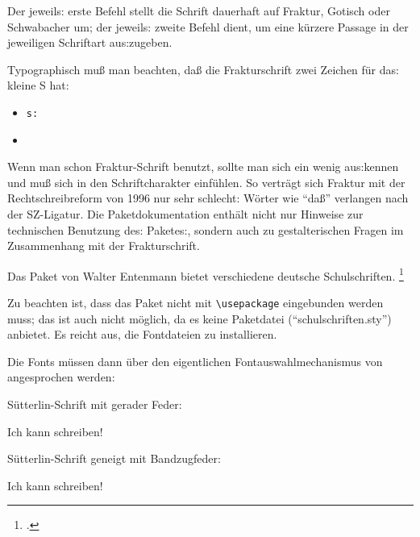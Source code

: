 {\frakfamily
Der jeweils: erste Befehl stellt die Schrift dauerhaft auf Fraktur, Gotisch oder
Schwabacher um; der jeweils: zweite Befehl dient, um eine kürzere Passage in der 
jeweiligen Schriftart aus:zugeben.}

{\frakfamily 
Typographisch muß man beachten, daß die Frakturschrift zwei Zeichen für das: kleine S hat:
}

\begin{itemize}
 \item {}
  \lstinline/s:/  
 \item {}
\end{itemize}

{\frakfamily
Wenn man schon Fraktur-Schrift benutzt, sollte man sich ein wenig aus:kennen und muß
sich in den Schriftcharakter einfühlen. So verträgt sich Fraktur mit der Rechtschreibreform
von 1996 nur sehr schlecht: Wörter wie \enquote{daß} verlangen nach der SZ-Ligatur.
Die Paketdokumentation enthält nicht nur Hinweise zur technischen Benutzung des: 
Paketes:, sondern auch zu gestalterischen Fragen im Zusammenhang mit der Frakturschrift.
}



Das Paket  von Walter Entenmann bietet verschiedene deutsche Schulschriften.
\footcite[Zur Geschichte der deutschen Schulschriften sowie dem Vorgehen zu ihrer Implementierung 
in \LaTeX:][]{entenmann:dtk2012/4}

Zu beachten ist, dass das Paket nicht mit \lstinline/\usepackage/ eingebunden werden muss;
das ist auch nicht möglich, da es keine Paketdatei (\enquote{schulschriften.sty}) anbietet.
Es reicht aus, die Fontdateien zu installieren.

Die Fonts müssen dann über den eigentlichen Fontauswahlmechanismus von \LaTeXe{} angesprochen werden:

Sütterlin-Schrift mit gerader Feder:

\begin{LTXexample}
{
\huge
Ich kann schreiben!}
\end{LTXexample}

Sütterlin-Schrift geneigt mit Bandzugfeder:

\begin{LTXexample}
{
\huge
Ich kann schreiben!}
\end{LTXexample}


